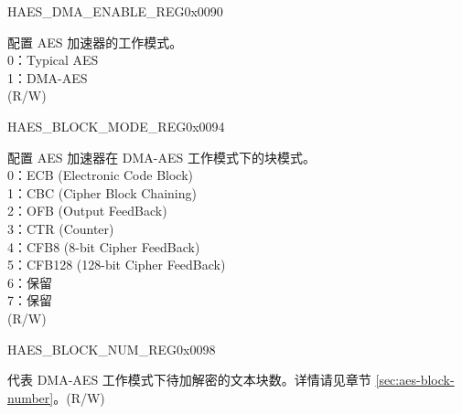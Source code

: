 \begin{register}{H}{AES\_DMA\_ENABLE\_REG}{0x0090}\label{regdesc:AESDMAENABLEREG}
%
%
\regnewline%
\begin{regdesc}\begin{reglist}
\item [AES\_DMA\_ENABLE] 配置 AES 加速器的工作模式。\\
0：Typical AES\\
1：DMA-AES\\
(R/W)
\end{reglist}\end{regdesc}
\end{register}


\begin{register}{H}{AES\_BLOCK\_MODE\_REG}{0x0094}\label{regdesc:AESBLOCKMODEREG}
%
%
\regnewline%
\begin{regdesc}\begin{reglist}
\item [AES\_BLOCK\_MODE] 配置 AES 加速器在 DMA-AES 工作模式下的块模式。\\
0：ECB (Electronic Code Block)\\
1：CBC (Cipher Block Chaining)\\
2：OFB (Output FeedBack)\\
3：CTR (Counter)\\
4：CFB8 (8-bit Cipher FeedBack)\\
5：CFB128 (128-bit Cipher FeedBack)\\
6：保留\\
7：保留\\
(R/W)
\end{reglist}\end{regdesc}
\end{register}


\begin{register}{H}{AES\_BLOCK\_NUM\_REG}{0x0098}\label{regdesc:AESBLOCKNUMREG}
%
\regnewline%
\begin{regdesc}\begin{reglist}
\item [AES\_BLOCK\_NUM] 代表 DMA-AES 工作模式下待加解密的文本块数。详情请见章节 \ref{sec:aes-block-number}。(R/W)
\end{reglist}\end{regdesc}
\end{register}


